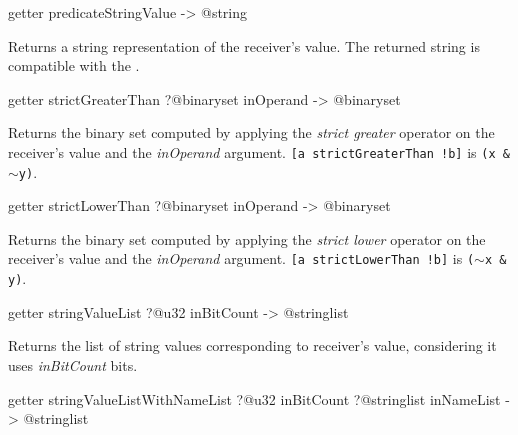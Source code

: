 \begin{galgas4box}
getter predicateStringValue -> @string
\end{galgas4box}

Returns a string representation of the receiver's value. The returned string is compatible with the .








\begin{galgas4box}
getter strictGreaterThan ?@binaryset inOperand -> @binaryset
\end{galgas4box}

Returns the binary set computed by applying the \emph{strict greater} operator on the receiver's value and the \emph{inOperand} argument.
{\texttt{[a strictGreaterThan !b]} is \texttt{(x \& $\sim$y)}.}








\begin{galgas4box}
getter strictLowerThan ?@binaryset inOperand -> @binaryset
\end{galgas4box}

Returns the binary set computed by applying the \emph{strict lower} operator on the receiver's value and the \emph{inOperand} argument.
{\texttt{[a strictLowerThan !b]} is \texttt{($\sim$x \& y)}.}








\begin{galgas4box}
getter stringValueList ?@u32 inBitCount -> @stringlist
\end{galgas4box}

Returns the list of string values corresponding to receiver's value, considering it uses \emph{inBitCount} bits.








\begin{galgas4box}
getter stringValueListWithNameList
  ?@u32 inBitCount
  ?@stringlist inNameList
  -> @stringlist
\end{galgas4box}


